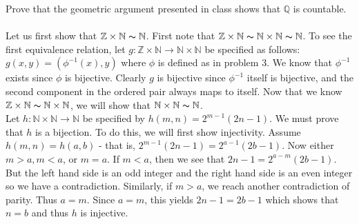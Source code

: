 \documentclass[12pt]{article}
\begin{document}
\problem Prove that the geometric argument presented in class shows that $\mathbb{Q}$ is countable. \\ \\

\noindent Let us first show that $\mathbb{Z} \times \mathbb{N} \thicksim \mathbb{N}$. First note that  $\mathbb{Z} \times \mathbb{N} \thicksim \mathbb{N} \times \mathbb{N} \thicksim \mathbb{N}$. To see the first equivalence relation, let $g:\mathbb{Z} \times \mathbb{N} \rightarrow \mathbb{N} \times \mathbb{N}$ be specified as follows: $g(x,y)= (\phi^{-1}(x),y)$ where $\phi$ is defined as in problem 3. We know that $\phi^{-1}$ exists since $\phi$ is bijective. Clearly $g$ is  bijective since $\phi^{-1}$ itself is bijective, and the second component in the ordered pair always maps to itself. Now that we know $\mathbb{Z} \times \mathbb{N} \thicksim \mathbb{N} \times \mathbb{N}$, we will show that $\mathbb{N} \times \mathbb{N} \thicksim \mathbb{N}$. \\

\noindent Let $h: \mathbb{N} \times \mathbb{N} \rightarrow \mathbb{N}$ be specified by $h(m,n)= 2^{m-1}(2n-1)$. We must prove that $h$ is a bijection.  To do this, we will first show injectivity. Assume $h(m,n)=h(a,b)$ - that is, $2^{m-1}(2n-1) = 2^{a-1}(2b-1)$. Now either $m>a, m<a$, or $m=a$. If $m<a$, then we see that $2n-1=2^{a-m}(2b-1)$. But the left hand side is an odd integer and the right hand side is an even integer so we have a contradiction. Similarly, if $m>a$, we reach another contradiction of parity. Thus $a=m$. Since $a=m$, this yields $2n-1=2b-1$ which shows that $n=b$ and thus $h$ is injective. \\ \\
\end{document}
